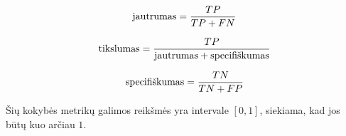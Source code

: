 \begin{equation}
\text{jautrumas} = {TP \over {TP + FN}}
\end{equation}

\begin{equation}
\text{tikslumas} = {TP \over {\text{jautrumas} + \text{specifiškumas} }}
\end{equation}

\begin{equation}
\text{specifiškumas} = {TN \over {TN + FP}}
\end{equation}

Šių kokybės metrikų galimos reikšmės yra intervale $[0, 1]$, siekiama, kad jos būtų kuo arčiau $1$.
